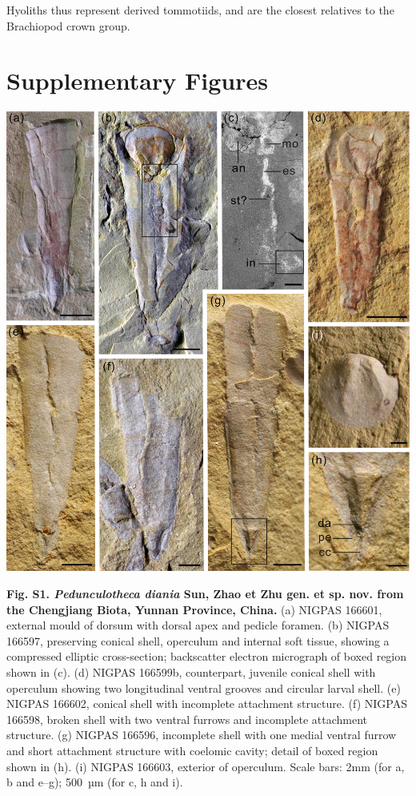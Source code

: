 \documentclass[openany]{book}
\theoremstyle{definition}
\theoremstyle{definition}
\theoremstyle{definition}
\theoremstyle{remark}
\begin{document}
\begin{description}
Hyoliths thus represent derived tommotiids, and are the closest
relatives to the Brachiopod crown group.
\end{description}

\hypertarget{figures}{\chapter*{Supplementary Figures}\label{figures}}

\begin{center}\includegraphics[width=0.8\linewidth]{images/image1} \end{center}

\textbf{Fig. S1. \emph{Pedunculotheca diania} Sun, Zhao et Zhu gen. et
sp. nov. from the Chengjiang Biota, Yunnan Province, China.} (a) NIGPAS
166601, external mould of dorsum with dorsal apex and pedicle foramen.
(b) NIGPAS 166597, preserving conical shell, operculum and internal soft
tissue, showing a compressed elliptic cross-section; backscatter
electron micrograph of boxed region shown in (c). (d) NIGPAS 166599b,
counterpart, juvenile conical shell with operculum showing two
longitudinal ventral grooves and circular larval shell. (e) NIGPAS
166602, conical shell with incomplete attachment structure. (f) NIGPAS
166598, broken shell with two ventral furrows and incomplete attachment
structure. (g) NIGPAS 166596, incomplete shell with one medial ventral
furrow and short attachment structure with coelomic cavity; detail of
boxed region shown in (h). (i) NIGPAS 166603, exterior of operculum.
Scale bars: 2mm (for a, b and e--g); 500~µm (for c, h and i).
\end{document}
